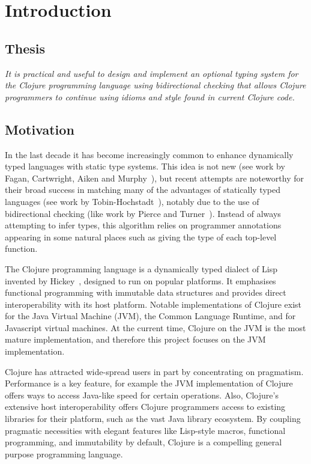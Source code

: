 \chapter{Introduction}

\section{Thesis}

\emph{It is practical and useful to design and implement an optional typing system 
for the Clojure programming language using bidirectional checking that allows Clojure programmers to continue 
using idioms and style found in current Clojure code.}

\section{Motivation}

In the last decade it has become increasingly common to enhance
dynamically typed languages with static type systems. 
This idea is not new (see work by Fagan, Cartwright, Aiken and Murphy~\cite{Fag91,CF91,AM91}), but recent attempts
are noteworthy for their broad success in matching many of the advantages of statically typed
languages (see work by Tobin-Hochstadt~\cite{Tob10}), 
notably due to the use of bidirectional checking (like work by Pierce and Turner~\cite{PT00}).
Instead of always attempting to infer types, this algorithm relies on programmer annotations
appearing in some natural places such as giving the type of each top-level function.

The Clojure programming language is a dynamically typed dialect of Lisp invented
by Hickey~\cite{Hic08}, designed to run on popular platforms.
It emphasises functional programming with immutable data structures
and provides direct interoperability with its host platform.
Notable implementations of Clojure exist for the Java Virtual Machine (JVM),
the Common Language Runtime, and for Javascript virtual machines.
At the current time, Clojure on the JVM is the most mature implementation,
and therefore this project focuses on the JVM implementation.

Clojure has attracted wide-spread users in part by concentrating on pragmatism.
Performance is a key feature, for example the JVM implementation of Clojure
offers ways to access Java-like speed for certain operations.
Also, Clojure's extensive host interoperability offers Clojure programmers
access to existing libraries for their platform, such as the vast Java library ecosystem.
By coupling pragmatic necessities with elegant features like Lisp-style macros, functional programming,
and immutability by default, Clojure is a compelling general purpose programming language.


